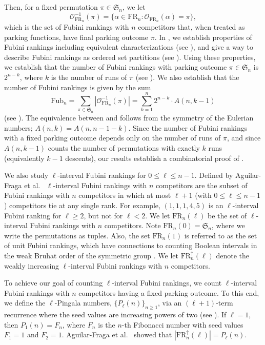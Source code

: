 \documentclass{amsart}
\theoremstyle{definition}
\theoremstyle{definition}
\theoremstyle{remark}
\newcommand{\Fub}{\mathrm{Fub}}
\newcommand{\FR}[1]{\mathrm{FR}_{#1}}
\newcommand{\out}{\mathcal{O}}
\newcommand{\Sym}{\mathfrak{S}}
\begin{document}
Then, for a fixed permutation $\pi \in \Sym_n$, we let 
\[\out_{\FR{n}}^{-1}(\pi)=\{\alpha\in\FR{n}:\out_{\FR{n}}(\alpha)=\pi\},\]
which is the set of Fubini rankings with $n$ competitors that, when treated as parking functions, have final parking outcome $\pi$.
In , we establish  properties of Fubini rankings including equivalent characterizations (see ), and give a way to describe Fubini rankings as ordered set partitions (see ). Using these properties, we establish that the number of Fubini rankings with parking outcome $\pi\in\Sym_n$ is $2^{n-k}$, where $k$ is the number of runs of $\pi$ (see ). We also establish that the number of Fubini rankings is given by the sum 
    \begin{equation}\label{eq:main results together}
\Fub_n=\sum_{\pi\in\mathfrak{S}_n}|\out_{\FR{n}}^{-1}(\pi)|=\sum_{k=1}^{n}2^{n-k}\cdot A(n,k-1) 
\end{equation}
    (see ).
    The equivalence between  and  follows from the symmetry of the Eulerian numbers; $A(n,k)=A(n,n-1-k)$.
Since the number of Fubini rankings with a fixed parking outcome depends only on the number of runs of $\pi$, and since $A(n,k-1)$ counts the number of permutations with exactly $k$ runs (equivalently $k-1$ descents), our results establish a combinatorial proof of .

We also study $\ell$-interval Fubini rankings for $0\leq \ell\leq n-1$.
Defined by Aguilar-Fraga et al.\ \cite[p.\ 16]{aguilarfraga2024interval}
$\ell$-interval Fubini rankings with $n$ competitors are the subset of Fubini rankings with $n$ competitors in which at most $\ell+1$ (with $0\leq \ell\leq n-1$) competitors tie at any single rank. 
For example, $(1,1,1,4,5)$ is an $\ell$-interval Fubini ranking for $\ell \geq 2$, but not for $\ell < 2$. 
We let $\FR{n}(\ell)$ be the set of $\ell$-interval Fubini rankings with $n$ competitors. 
Note $\FR{n}(0)=\Sym_n$, where we write the permutations as tuples. Also, the set $\FR{n}(1)$ is referred to as the set of unit Fubini rankings, which have connections to counting Boolean intervals in the weak Bruhat order of the symmetric group \cite{weak}. 
We let $\FR{n}^\uparrow(\ell)$ denote the weakly increasing $\ell$-interval Fubini rankings with $n$ competitors.

To achieve our goal of counting $\ell$-interval Fubini rankings, we count $\ell$-interval Fubini rankings with $n$ competitors having a fixed parking outcome. 
To this end, 
we define the $\ell$-Pingala numbers, $\{P_\ell(n)\}_{n\geq1}$, via an $(\ell+1)$-term recurrence where the seed values are increasing powers of two (see ). 
If $\ell=1$, then $P_1(n)=F_n$, where $F_n$ is the $n$-th Fibonacci number with seed values $F_1=1$ and $F_2=1$. 
Aguilar-Fraga et al.\ \cite{aguilarfraga2024interval} showed that $|\FR{n}^\uparrow(\ell)|=P_\ell(n)$.
\end{document}
